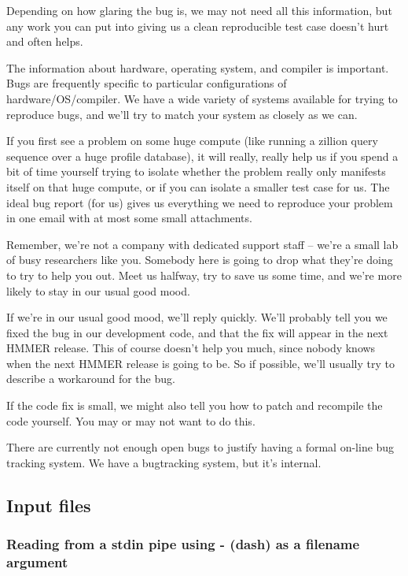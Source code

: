 Depending on how glaring the bug is, we may not need all this
information, but any work you can put into giving us a clean
reproducible test case doesn't hurt and often helps.

The information about hardware, operating system, and compiler is
important. Bugs are frequently specific to particular configurations
of hardware/OS/compiler.  We have a wide variety of systems available
for trying to reproduce bugs, and we'll try to match your system as
closely as we can.

If you first see a problem on some huge compute (like running a
zillion query sequence over a huge profile database), it will really,
really help us if you spend a bit of time yourself trying to isolate
whether the problem really only manifests itself on that huge compute,
or if you can isolate a smaller test case for us. The ideal bug report
(for us) gives us everything we need to reproduce your problem in one
email with at most some small attachments. 

Remember, we're not a company with dedicated support staff -- we're a
small lab of busy researchers like you. Somebody here is going to drop
what they're doing to try to help you out. Meet us halfway, try to
save us some time, and we're more likely to stay in our usual good
mood.

If we're in our usual good mood, we'll reply quickly. We'll probably
tell you we fixed the bug in our development code, and that the fix
will appear in the next HMMER release. This of course doesn't help you
much, since nobody knows when the next HMMER release is going to be.
So if possible, we'll usually try to describe a workaround for the
bug. 

If the code fix is small, we might also tell you how to patch and
recompile the code yourself. You may or may not want to do this.

There are currently not enough open bugs to justify having a formal
on-line bug tracking system. We have a bugtracking system, but it's
internal.




\subsection{Input files}

\subsubsection{Reading from a stdin pipe using - (dash) as a filename argument}

